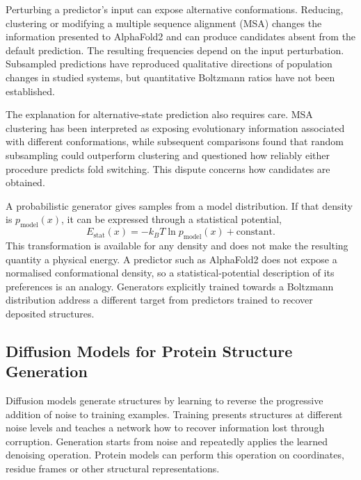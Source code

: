 Perturbing a predictor's input can expose alternative conformations. Reducing, clustering or modifying a multiple sequence alignment (MSA) changes the information presented to AlphaFold2 and can produce candidates absent from the default prediction.\supercite{steinSPEACH_AFSamplingProtein2022,wayment-steelePredictingMultipleConformations2024} The resulting frequencies depend on the input perturbation. Subsampled predictions have reproduced qualitative directions of population changes in studied systems, but quantitative Boltzmann ratios have not been established.\supercite{monteirodasilvaHighthroughputPredictionProtein2024}

The explanation for alternative-state prediction also requires care. MSA clustering has been interpreted as exposing evolutionary information associated with different conformations, while subsequent comparisons found that random subsampling could outperform clustering and questioned how reliably either procedure predicts fold switching.\supercite{wayment-steelePredictingMultipleConformations2024,schaferSequenceClusteringConfounds2024} This dispute concerns how candidates are obtained.

A probabilistic generator gives samples from a model distribution. If that density is $p_{\text{model}}(x)$, it can be expressed through a statistical potential,
\begin{equation}
    E_{\text{stat}}(x)=-k_BT\ln p_{\text{model}}(x)+\text{constant}.
    \label{eq:bg-statistical-potential}
\end{equation}
This transformation is available for any density and does not make the resulting quantity a physical energy.\supercite{bmsb2012ch2,bmsb2012ch4} A predictor such as AlphaFold2 does not expose a normalised conformational density, so a statistical-potential description of its preferences is an analogy. Generators explicitly trained towards a Boltzmann distribution address a different target from predictors trained to recover deposited structures.\supercite{noeBoltzmannGeneratorsSampling2019}

\subsection{Diffusion Models for Protein Structure Generation}
\label{sec:bg-diffusion}

Diffusion models generate structures by learning to reverse the progressive addition of noise to training examples. Training presents structures at different noise levels and teaches a network how to recover information lost through corruption. Generation starts from noise and repeatedly applies the learned denoising operation. Protein models can perform this operation on coordinates, residue frames or other structural representations.\supercite{yimDiffusionModelsProtein2024}

